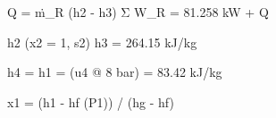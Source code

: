 Q = ṁ_R (h2 - h3)  
Σ W_R = 81.258 kW + Q  

h2 (x2 = 1, s2)  
h3 = 264.15 kJ/kg  

h4 = h1 = (u4 @ 8 bar) = 83.42 kJ/kg  

x1 = (h1 - hf (P1)) / (hg - hf)